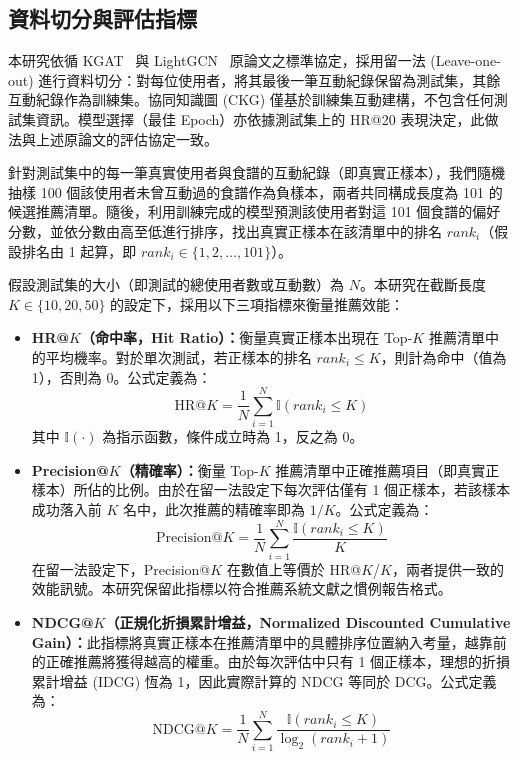 \subsection*{資料切分與評估指標}

本研究依循 KGAT~\cite{wang2019kgat} 與 LightGCN~\cite{he2020lightgcn} 原論文之標準協定，採用留一法 (Leave-one-out) 進行資料切分：對每位使用者，將其最後一筆互動紀錄保留為測試集，其餘互動紀錄作為訓練集。協同知識圖 (CKG) 僅基於訓練集互動建構，不包含任何測試集資訊。模型選擇（最佳 Epoch）亦依據測試集上的 HR@20 表現決定，此做法與上述原論文的評估協定一致。

針對測試集中的每一筆真實使用者與食譜的互動紀錄（即真實正樣本），我們隨機抽樣 100 個該使用者未曾互動過的食譜作為負樣本，兩者共同構成長度為 101 的候選推薦清單。隨後，利用訓練完成的模型預測該使用者對這 101 個食譜的偏好分數，並依分數由高至低進行排序，找出真實正樣本在該清單中的排名 $rank_i$（假設排名由 1 起算，即 $rank_i \in \{1, 2, \dots, 101\}$）。

假設測試集的大小（即測試的總使用者數或互動數）為 $N$。本研究在截斷長度 $K \in \{10, 20, 50\}$ 的設定下，採用以下三項指標來衡量推薦效能：

\begin{itemize}[leftmargin=2em]
  \item \textbf{HR@$K$（命中率，Hit Ratio）：}衡量真實正樣本出現在 Top-$K$ 推薦清單中的平均機率。對於單次測試，若正樣本的排名 $rank_i \leq K$，則計為命中（值為 1），否則為 0。公式定義為：
  \begin{equation}
    \text{HR}@K = \frac{1}{N}\sum_{i=1}^{N} \mathbb{I}(rank_i \leq K)
  \end{equation}
  其中 $\mathbb{I}(\cdot)$ 為指示函數，條件成立時為 1，反之為 0。
  
  \item \textbf{Precision@$K$（精確率）：}衡量 Top-$K$ 推薦清單中正確推薦項目（即真實正樣本）所佔的比例。由於在留一法設定下每次評估僅有 1 個正樣本，若該樣本成功落入前 $K$ 名中，此次推薦的精確率即為 $1/K$。公式定義為：
  \begin{equation}
    \text{Precision}@K = \frac{1}{N}\sum_{i=1}^{N} \frac{\mathbb{I}(rank_i \leq K)}{K}
  \end{equation}
  在留一法設定下，Precision@$K$ 在數值上等價於 HR@$K$/$K$，兩者提供一致的效能訊號。本研究保留此指標以符合推薦系統文獻之慣例報告格式。
    
  \item \textbf{NDCG@$K$（正規化折損累計增益，Normalized Discounted Cumulative Gain）：}此指標將真實正樣本在推薦清單中的具體排序位置納入考量，越靠前的正確推薦將獲得越高的權重。由於每次評估中只有 1 個正樣本，理想的折損累計增益 (IDCG) 恆為 1，因此實際計算的 NDCG 等同於 DCG。公式定義為：
  \begin{equation}
    \text{NDCG}@K = \frac{1}{N}\sum_{i=1}^{N} \frac{\mathbb{I}(rank_i \leq K)}{\log_2(rank_i + 1)}
  \end{equation}
\end{itemize}

